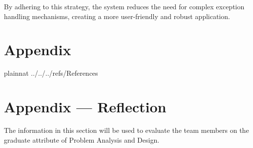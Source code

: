 \documentclass[12pt, titlepage]{article}
\begin{document}
By adhering to this strategy, the system reduces the need for complex exception handling mechanisms, creating a more user-friendly and robust application.



\newpage{}

\section{Appendix} \label{Appendix}


 {plainnat}
 {../../../refs/References}

\newpage{}

\section*{Appendix --- Reflection}


The information in this section will be used to evaluate the team members on the
graduate attribute of Problem Analysis and Design.

%
\end{document}
